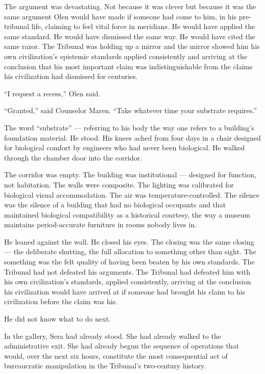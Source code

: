 The argument was devastating. Not because it was clever but because it was the same argument Olen would have made if someone had come to him, in his pre-tribunal life, claiming to feel vital force in meridians. He would have applied the same standard. He would have dismissed the same way. He would have cited the same razor. The Tribunal was holding up a mirror and the mirror showed him his own civilization's epistemic standards applied consistently and arriving at the conclusion that his most important claim was indistinguishable from the claims his civilization had dismissed for centuries.

\enquote{I request a recess,} Olen said.

\enquote{Granted,} said Counselor Maren. \enquote{Take whatever time your substrate requires.}

The word \enquote{substrate} — referring to his body the way one refers to a building's foundation material. He stood. His knees ached from four days in a chair designed for biological comfort by engineers who had never been biological. He walked through the chamber door into the corridor.

The corridor was empty. The building was institutional — designed for function, not habitation. The walls were composite. The lighting was calibrated for biological visual accommodation. The air was temperature-controlled. The silence was the silence of a building that had no biological occupants and that maintained biological compatibility as a historical courtesy, the way a museum maintains period-accurate furniture in rooms nobody lives in.

He leaned against the wall. He closed his eyes. The closing was the same closing — the deliberate shutting, the full allocation to something other than sight. The something was the felt quality of having been beaten by his own standards. The Tribunal had not defeated his arguments. The Tribunal had defeated him with his own civilization's standards, applied consistently, arriving at the conclusion his civilization would have arrived at if someone had brought his claim to his civilization before the claim was his.

He did not know what to do next.

In the gallery, Sera had already stood. She had already walked to the administrative exit. She had already begun the sequence of operations that would, over the next six hours, constitute the most consequential act of bureaucratic manipulation in the Tribunal's two-century history.


